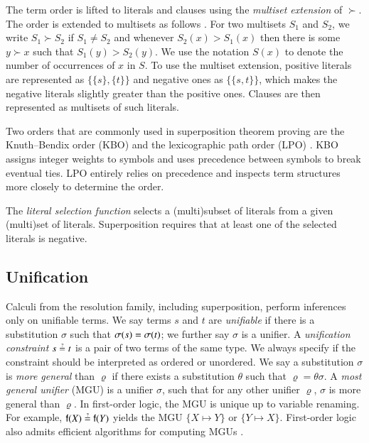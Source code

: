 The term order is lifted to literals and clauses using the {\em multiset extension} of
$\succ$. The order is extended to multisets as follows
\cite[Sect.~2.5]{bg-01-resolution}. For two multisets $S_1$ and $S_2$, we write $S_1 \succ S_2$ if $S_1 \not= S_2$
and whenever $S_2(x) > S_1(x)$ then there is some $y \succ x$ such that $S_1(y)
> S_2(y)$. We use the notation $S(x)$ to denote the number of occurrences of $x$ in
$S$. To use the  multiset extension, positive literals are represented as $ \{ \{s\},
\{t\} \}$ and negative ones as $\{ \{ s, t \} \}$, which makes the negative literals slightly greater than the positive ones.
Clauses are then represented as 
multisets of such literals. 

Two orders that are commonly used in superposition theorem proving are the
Knuth--Bendix order (KBO) \cite[Sect.~5.4.4]{bn-98-tr-and-all-that} and the
lexicographic path order (LPO) \cite[Sect.~5.4.2]{bn-98-tr-and-all-that}.
KBO assigns integer weights to symbols and uses precedence between symbols to
break eventual ties. LPO entirely relies on precedence and inspects term
structures more closely to determine the order. 

\newcommand{\selfun}{\ensuremath{\mathit{Sel}}}
The {\em literal selection function} selects a (multi)subset of literals
from a given (multi)set of literals. Superposition requires that at least one of the selected literals is negative.
\pagebreak[2] 

\subsection{Unification}
\label{sec:pre:unif}

Calculi from the resolution family, including superposition, perform inferences
only on unifiable terms. We say terms $s$ and $t$ are {\em unifiable} if there is a
substitution $\sigma$ such that $\sigma(s) = \sigma(t)$; we further say
$\sigma$ is a unifier. A \emph{unification constraint} $s \unif t$ is a pair of two terms of the same type. 
We always specify if the constraint should be interpreted as ordered or unordered.
We say a substitution $\sigma$ is \emph{more general} than $\varrho$ if there exists a substitution $\theta$
such that $\varrho = \theta\sigma$.
A \emph{most general unifier} ({MGU}) is a
unifier $\sigma$, such that for any other unifier $\varrho$, $\sigma$ is more general than $\varrho$. In first-order logic,
the MGU is unique up to variable renaming. For example, $\cst{f}(X) \unif \cst{f}(Y)$ yields the MGU 
$\{ X \mapsto Y\}$ or  $\{ Y \mapsto X \}$. First-order logic also admits efficient algorithms for computing MGUs \cite{hv-09-unifalgs}.

